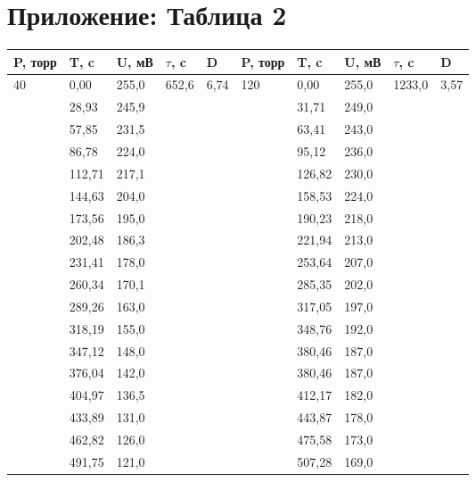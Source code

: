 \documentclass[a4paper,12pt]{article}
\theoremstyle{plain} %
\theoremstyle{definition} %
\theoremstyle{remark} %
\begin{document}
    \section{Приложение: Таблица 2}
        \begin{center}
            \begin{tabular}{ | l | l | l | l | l | l | l | l | l | l |}
                \hline
                P, торр	&	T, c	&   U, мВ	&	$\tau$, c	&	D   &   P, торр	    &   T, c	&	U, мВ	&	$\tau$, c	&	D	\\
                \hline
                40	&	0,00	&	255,0	&	652,6   &	6,74    &   120 &	0,00	&	255,0	&	1233,0	&	3,57	\\
              	    &	28,93	&	245,9	&	  	&	&   &   31,71	&	249,0	&	  	&	\\
              	    &	57,85	&	231,5	&	  	&   &	&   63,41	&	243,0	&	  	&\\
              	    &	86,78	&	224,0	&	  	&	&	&   95,12	&	236,0	&	  	&  	\\
              	    &	112,71	&	217,1	&	  	&	&	&   126,82	&	230,0	&	  	&  	\\
              	    &	144,63	&	204,0	&	  	&	&	&   158,53	&	224,0	&	  	&  	\\
              	    &	173,56	&	195,0	&	  	&	&	&   190,23	&	218,0	&	  	&  	\\
              	    &	202,48	&	186,3	&	  	&	&	&   221,94	&	213,0	&	  	&  	\\
              	    &	231,41	&	178,0	&	  	&	&	&   253,64	&	207,0	&	  	&  	\\
              	    &	260,34	&	170,1	&	  	&	&	&   285,35	&	202,0	&	  	&  	\\
              	    &	289,26	&	163,0	&	  	&	&	&   317,05	&	197,0	&	  	&  	\\
              	    &	318,19	&	155,0	&	  	&	&	&   348,76	&	192,0	&	  	&  	\\
              	    &	347,12	&	148,0	&	  	&	&	&   380,46	&	187,0	&	  	&  	\\
              	    &	376,04	&	142,0	&	  	&	&	&   380,46	&	187,0	&	  	&  	\\
              	    &	404,97	&	136,5	&	  	&	&	&   412,17	&	182,0	&	  	&  	\\
              	    &	433,89	&	131,0	&	  	&	&	&   443,87	&	178,0	&	  	&  	\\
              	    &	462,82	&	126,0	&	  	&	&	&   475,58	&	173,0	&	  	&  	\\
              	    &	491,75	&	121,0	&	  	&	&	&   507,28	&	169,0	&	  	&  	\\

\end{tabular}
\end{center}
\end{document}

